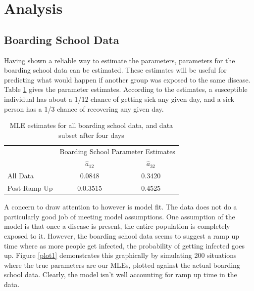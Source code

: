 \documentclass{svproc}
\begin{document}
\section{Analysis}
\subsection*{Boarding School Data}
Having shown a reliable way to estimate the parameters, parameters for the boarding school data can be estimated. These estimates will be useful for predicting what would happen if another group was exposed to the same disease. Table \ref{tab2} gives the parameter estimates. According to the estimates, a susceptible individual has about a 1/12 chance of getting sick any given day, and a sick person has a 1/3 chance of recovering any given day.
\begin{table}
\centering
\setlength{\tabcolsep}{30pt}
\begin{tabular}{l|c|c|}
\cline{2-3}
&\multicolumn{2}{|c|}{Boarding School Parameter Estimates} \\
\cline{2-3}
&$\hat{a}_{12}$ & $\hat{a}_{32}$ \\ \hline
All Data&0.0848 & 0.3420 \\ \hline
Post-Ramp Up&0.0.3515 & 0.4525 \\ \hline
\end{tabular}
\caption{MLE estimates for all boarding school data, and data subset after four days}
\label{tab2}
\end{table}

A concern to draw attention to however is model fit. The data does not do a particularly good job of meeting model assumptions. One assumption of the model is that once a disease is present, the entire population is completely exposed to it. However, the boarding school data seems to suggest a ramp up time where as more people get infected, the probability of getting infected goes up. Figure \ref{plot1} demonstrates this graphically by simulating 200 situations where the true parameters are our MLEs, plotted against the actual boarding school data. Clearly, the model isn't well accounting for ramp up time in the data.
\end{document}
